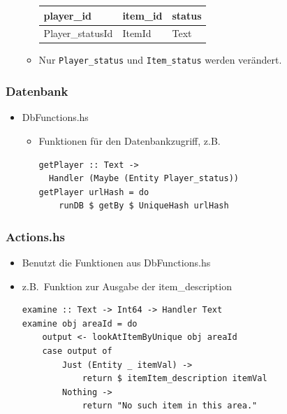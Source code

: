 \documentclass[hyperref={pdfpagelabels=false}]{beamer}
\begin{document}
\begin{frame}[fragile]
\begin{itemize}
\begin{itemize}
{\begin{table}[!h]
              \begin{flushleft}
                \begin{tabular}{lll}
                  player\_id & item\_id & status \\ \hline
                  Player\_statusId & ItemId & Text 
                \end{tabular}
              \end{flushleft}
            \end{table}
          }
        \item Nur \verb|Player_status| und \verb|Item_status| werden verändert.
      \end{itemize}
  \end{itemize}
\end{frame}
\begin{frame}[fragile]
  \frametitle{Datenbank}
  \begin{itemize}
    \item DbFunctions.hs
      \begin{itemize}
        \item Funktionen für den Datenbankzugriff, z.B.
          \begin{lstlisting}
getPlayer :: Text ->
  Handler (Maybe (Entity Player_status))
getPlayer urlHash = do
    runDB $ getBy $ UniqueHash urlHash
          \end{lstlisting}
      \end{itemize}
  \end{itemize}
\end{frame}
\begin{frame}[fragile]
  \frametitle{Actions.hs}
  \begin{itemize}
    \item Benutzt die Funktionen aus DbFunctions.hs
    \item z.B.\ Funktion zur Ausgabe der item\_description
    \begin{lstlisting}
examine :: Text -> Int64 -> Handler Text
examine obj areaId = do
    output <- lookAtItemByUnique obj areaId
    case output of
        Just (Entity _ itemVal) ->
            return $ itemItem_description itemVal
        Nothing ->
            return "No such item in this area."
    \end{lstlisting}
  \end{itemize}
\end{frame}
\end{document}
